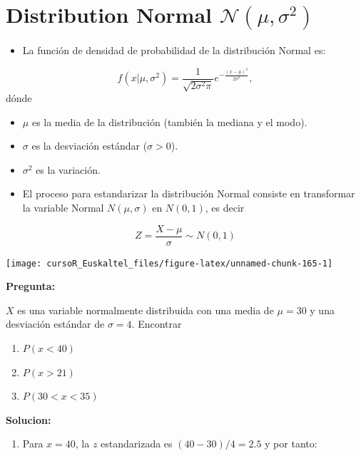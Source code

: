 \documentclass[]{book}
\providecommand{\tightlist}{%
  \setlength{\itemsep}{0pt}\setlength{\parskip}{0pt}}
\begin{document}
\section{\texorpdfstring{Distribution Normal
\(\mathcal{N}(\mu,\sigma^2)\)}{Distribution Normal \textbackslash{}mathcal\{N\}(\textbackslash{}mu,\textbackslash{}sigma\^{}2)}}\label{distribution-normal-mathcalnmusigma2}

\begin{itemize}
\tightlist
\item
  La función de densidad de probabilidad de la distribución Normal es:
\end{itemize}

\[
f(x | \mu,\sigma^2) = \frac{1}{\sqrt{2\sigma^2\pi}} e ^{-\frac{(x-\mu)^2}{2\sigma^2}},
\] dónde

\begin{itemize}
\item
  \(\mu\) es la media de la distribución (también la mediana y el modo).
\item
  \(\sigma\) es la desviación estándar (\(\sigma>0\)).
\item
  \(\sigma^2\) es la variación.
\item
  El proceso para estandarizar la distribución Normal consiste en
  transformar la variable Normal \(N(\mu,\sigma)\) en \(N(0,1)\), es
  decir
\end{itemize}

\[
Z = \frac{X-\mu}{\sigma} \sim N(0,1)
\]

\begin{center}\texttt{[image: cursoR\_Euskaltel\_files/figure-latex/unnamed-chunk-165-1]} \end{center}

\textbf{Pregunta:}

\(X\) es una variable normalmente distribuida con una media de
\(\mu = 30\) y una desviación estándar de \(\sigma = 4\). Encontrar

\begin{enumerate}
\def\labelenumi{\alph{enumi})}
\item
  \(P(x<40)\)
\item
  \(P(x>21)\)
\item
  \(P(30<x<35)\)
\end{enumerate}

\textbf{Solucion:}

\begin{enumerate}
\def\labelenumi{\alph{enumi})}
\tightlist
\item
  Para \(x=40\), la \(z\) estandarizada es \((40-30)/4=2.5\) y por
  tanto:
\end{enumerate}
\end{document}
